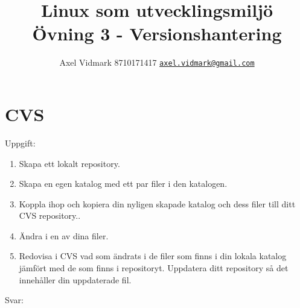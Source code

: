 \documentclass[10pt, a4paper]{article}
\author{Axel Vidmark 8710171417 \href{mailto:axel.vidmark@gmail.com}{\texttt{axel.vidmark@gmail.com}}}
\title{Linux som utvecklingsmiljö \\ Övning 3 - Versionshantering}
\begin{document}
\maketitle


\section*{CVS}\label{sec:cvs}

Uppgift:
\begin{enumerate}
\item Skapa ett lokalt repository.
\item Skapa en egen katalog med ett par filer i den katalogen.
\item Koppla ihop och kopiera din nyligen skapade katalog och dess filer till ditt CVS repository..
\item Ändra i en av dina filer.
\item Redovisa i CVS vad som ändrats i de filer som finns i din lokala katalog jämfört med de som finns i repositoryt.
Uppdatera ditt repository så det innehåller din uppdaterade fil.
\end{enumerate}

\vspace{10pt}
Svar:
\end{document}
